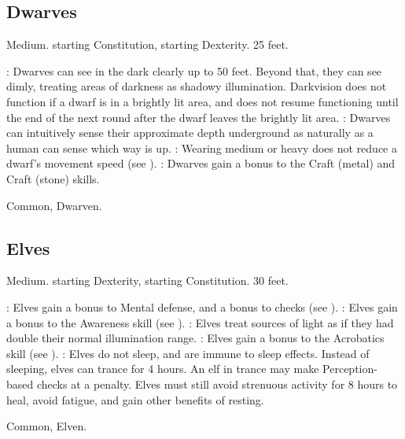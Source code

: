 \subsection{Dwarves}
 Medium.
  starting Constitution,  starting Dexterity.
 25 feet.
\begin{itemize}
    : Dwarves can see in the dark clearly up to 50 feet. Beyond that, they can see dimly, treating areas of darkness as shadowy illumination. Darkvision does not function if a dwarf is in a brightly lit area, and does not resume functioning until the end of the next round after the dwarf leaves the brightly lit area.
    : Dwarves can intuitively sense their approximate depth underground as naturally as a human can sense which way is up.
    : Wearing medium or heavy  does not reduce a dwarf's movement speed (see ).
    : Dwarves gain a  bonus to the Craft (metal) and Craft (stone) skills.
\end{itemize}
 Common, Dwarven.

\subsection{Elves}
 Medium.
  starting Dexterity,  starting Constitution.
 30 feet.
\begin{itemize}
    : Elves gain a  bonus to Mental defense, and a  bonus to  checks (see ).
    : Elves gain a  bonus to the Awareness skill (see ).
    : Elves treat sources of light as if they had double their normal illumination range.
    : Elves gain a  bonus to the Acrobatics skill (see ).
    : Elves do not sleep, and are immune to sleep effects. Instead of sleeping, elves can trance for 4 hours. An elf in trance may make Perception-based checks at a  penalty. Elves must still avoid strenuous activity for 8 hours to heal, avoid fatigue, and gain other benefits of resting.
\end{itemize}
 Common, Elven.

